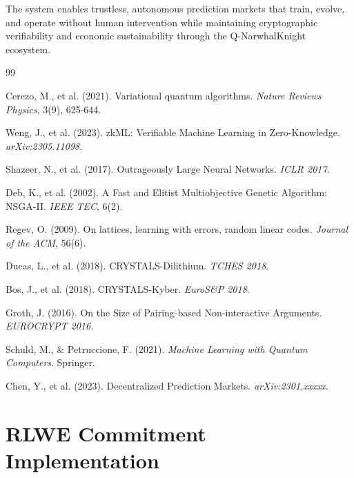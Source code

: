 \documentclass[11pt,a4paper]{article}
\begin{document}
The system enables trustless, autonomous prediction markets that train, evolve, and operate without human intervention while maintaining cryptographic verifiability and economic sustainability through the Q-NarwhalKnight ecosystem.


\begin{thebibliography}{99}

 Cerezo, M., et al. (2021). Variational quantum algorithms. \textit{Nature Reviews Physics}, 3(9), 625-644.

 Weng, J., et al. (2023). zkML: Verifiable Machine Learning in Zero-Knowledge. \textit{arXiv:2305.11098}.

 Shazeer, N., et al. (2017). Outrageously Large Neural Networks. \textit{ICLR 2017}.

 Deb, K., et al. (2002). A Fast and Elitist Multiobjective Genetic Algorithm: NSGA-II. \textit{IEEE TEC}, 6(2).

 Regev, O. (2009). On lattices, learning with errors, random linear codes. \textit{Journal of the ACM}, 56(6).

 Ducas, L., et al. (2018). CRYSTALS-Dilithium. \textit{TCHES 2018}.

 Bos, J., et al. (2018). CRYSTALS-Kyber. \textit{EuroS\&P 2018}.

 Groth, J. (2016). On the Size of Pairing-based Non-interactive Arguments. \textit{EUROCRYPT 2016}.

 Schuld, M., \& Petruccione, F. (2021). \textit{Machine Learning with Quantum Computers}. Springer.

 Chen, Y., et al. (2023). Decentralized Prediction Markets. \textit{arXiv:2301.xxxxx}.

\end{thebibliography}

\appendix

\section{RLWE Commitment Implementation}
\end{document}
